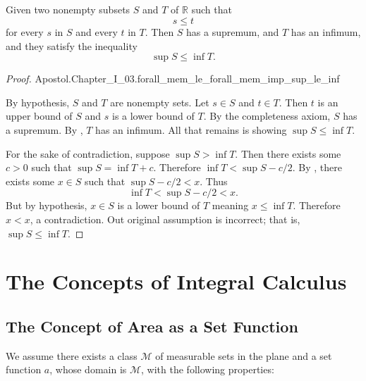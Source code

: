 \documentclass{report}
\begin{document}
\section{}%
\label{sec:theorem-i.34}

\begin{theorem}[I.34]

  Given two nonempty subsets $S$ and $T$ of $\mathbb{R}$ such that $$s \leq t$$
    for every $s$ in $S$ and every $t$ in $T$. Then $S$ has a supremum, and $T$
    has an infimum, and they satisfy the inequality $$\sup{S} \leq \inf{T}.$$

\end{theorem}

\begin{proof}

    {Apostol.Chapter\_I\_03.forall\_mem\_le\_forall\_mem\_imp\_sup\_le\_inf}

  By hypothesis, $S$ and $T$ are nonempty sets.
  Let $s \in S$ and $t \in T$.
  Then $t$ is an upper bound of $S$ and $s$ is a lower bound of $T$.
  By the completeness axiom, $S$ has a supremum.
  By , $T$ has an infimum.
  All that remains is showing $\sup{S} \leq \inf{T}$.

  For the sake of contradiction, suppose $\sup{S} > \inf{T}$.
  Then there exists some $c > 0$ such that $\sup{S} = \inf{T} + c$.
  Therefore $\inf{T} < \sup{S} - c / 2$.
  By , there exists some $x \in S$ such that
    $\sup{S} - c / 2 < x$.
  Thus $$\inf{T} < \sup{S} - c / 2 < x.$$
  But by hypothesis, $x \in S$ is a lower bound of $T$ meaning $x \leq \inf{T}$.
  Therefore $x < x$, a contradiction.
  Out original assumption is incorrect; that is, $\sup{S} \leq \inf{T}$.

\end{proof}

\chapter{The Concepts of Integral Calculus}%
\label{chap:concepts-integral-calculus}

\section{The Concept of Area as a Set Function}%
\label{sec:concept-area-set-function}

We assume there exists a class $\mathscr{M}$ of measurable sets in the plane and
  a set function $a$, whose domain is $\mathscr{M}$, with the following
  properties:
\end{document}
